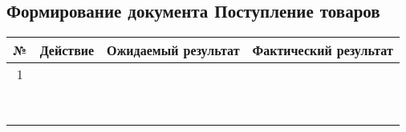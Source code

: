 \subsection{Формирование документа Поступление товаров}


\begin{tabular}{|c|c|c|c|}
	\hline
	№ & Действие & Ожидаемый результат & Фактический результат \\
	\hline
   1 &  &  &  \\
	\hline
	&  &  &  \\
	\hline
	&  &  &  \\
	\hline
	&  &  &  \\
	\hline
	&  &  &  \\
	\hline
	&  &  &  \\
	\hline
	&  &  &  \\
	\hline
	&  &  &  \\
	\hline
	&  &  &  \\
	\hline
\end{tabular}